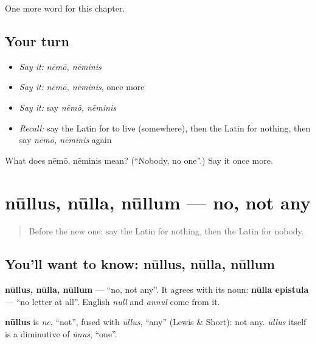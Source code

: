 \begin{grammarlens}[title={What you've built}]
One more word for this chapter.
\end{grammarlens}

\subsection*{Your turn}
\begin{itemize}
\raggedright
  \item \emph{Say it:} \emph{nēmō, nēminis}
  \item \emph{Say it:} \emph{nēmō, nēminis}, once more
  \item \emph{Say it:} say \emph{nēmō, nēminis}
  \item \emph{Recall:} say the Latin for to live (somewhere), then the Latin for nothing, then say \emph{nēmō, nēminis} again
\end{itemize}

\begin{tcolorbox}[breakable,colback=teal!4,colframe=teal!35!black,title={Before you move on}]
What does nēmō, nēminis mean? (\textquotedblleft{}Nobody, no one\textquotedblright{}.) Say it once more.
\end{tcolorbox}
\section[nūllus, nūlla, nūllum]{nūllus, nūlla, nūllum — no, not any}

\label{lesson:LA-C161-nullus}



\begin{quote}
Before the new one: say the Latin for nothing, then the Latin for nobody.
\end{quote}

\subsection*{You'll want to know: nūllus, nūlla, nūllum}
\textbf{nūllus, nūlla, nūllum} — \textquotedblleft{}no, not any\textquotedblright{}. It agrees with its noun: \textbf{nūlla epistula} — \textquotedblleft{}no letter at all\textquotedblright{}. English \emph{null} and \emph{annul} come from it.

\begin{cousinweb}
\textbf{nūllus} is \emph{ne}, \textquotedblleft{}not\textquotedblright{}, fused with \emph{ūllus}, \textquotedblleft{}any\textquotedblright{} (Lewis \& Short): not any. \emph{ūllus} itself is a diminutive of \emph{ūnus}, \textquotedblleft{}one\textquotedblright{}.
\end{cousinweb}

